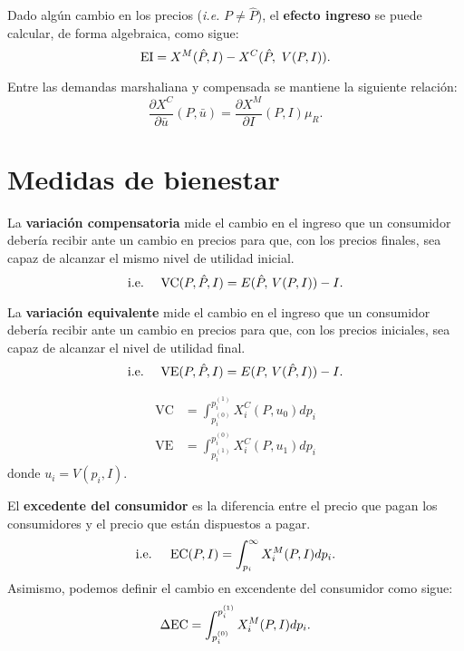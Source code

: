 \documentclass[8pt,a4paper]{extarticle}
\begin{document}
\begin{multicols}{3}
\begin{boxdef}
	Dado algún cambio en los precios (\emph{i.e.} $P \neq \hat{P}$), el \textbf{efecto ingreso} se puede calcular, de forma algebraica, como sigue:
	\[
		\text{\normalfont EI} = X^M(\hat{P}, I) - X^C(\hat{P},\ V(P, I))
	.\] 
\end{boxdef}

\begin{boxtheo}
	Entre las demandas marshaliana y compensada se mantiene la siguiente relación:
	\[
		\frac{\partial X^C}{\partial \bar{u}} (P, \bar{u}) = \frac{\partial X^M}{\partial I} (P, I) \mu_R
	.\] 
\end{boxtheo}

\newpage

\section{Medidas de bienestar}

\begin{boxdef}
	La \textbf{variación compensatoria} mide el cambio en el ingreso que un consumidor debería recibir ante un cambio en precios para que, con los precios finales, sea capaz de alcanzar el mismo nivel de utilidad inicial.
	\[
		\text{\normalfont i.e.}\quad \text{ \normalfont VC} (P, \hat{P}, I) = E(\hat{P}, \, V(P, I)) - I
	.\] 
\end{boxdef}

\begin{boxdef}
	La \textbf{variación equivalente} mide el cambio en el ingreso que un consumidor debería recibir ante un cambio en precios para que, con los precios iniciales, sea capaz de alcanzar el nivel de utilidad final.
	\[
		\text{\normalfont i.e.}\quad \text{ \normalfont VE} (P, \hat{P}, I) = E(P, \, V(\hat{P}, I)) - I
	.\] 
\end{boxdef}

\begin{boxtheo}
	\begin{equation*}
	\begin{aligned}
		\text{VC} & = \int_{p_i^{(0)}}^{p_i^{(1)}} X_i^C (P, u_0) dp_i\\
		\text{VE} & = \int_{p_i^{(1)}}^{p_i^{(0)}} X_i^C (P, u_1) dp_i
	\end{aligned}
	\end{equation*}
	donde $u_i = V(p_i, I)$.
\end{boxtheo}

\begin{boxdef}
	El \textbf{excedente del consumidor} es la diferencia entre el precio que pagan los consumidores y el precio que están dispuestos a pagar.
	\[
		\text{\normalfont i.e. \quad EC}(P, I) = \int_{p_i}^{\infty} X_i^M (P, I) dp_i
	.\]
	Asimismo, podemos definir el cambio en excendente del consumidor como sigue:
	\[
		\Delta \text{\normalfont EC} = \int_{p_i^{(0)}}^{p_i^{(1)}} X_i^M (P, I) dp_i
	.\] 
\end{boxdef}


\end{multicols}
\end{document}
